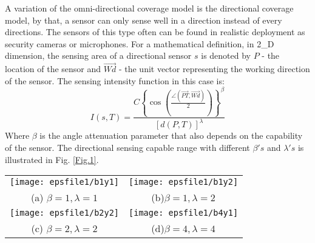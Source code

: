 \documentclass[final]{elsarticle}
\begin{document}
A variation of the omni-directional coverage model is the directional coverage model, by that, a sensor can only sense well in a direction instead of every directions. The sensors of this type often can be found in realistic deployment as security cameras or microphones.  For a mathematical definition, in 2\_D dimension, the sensing area of a directional sensor $ s $ is denoted by $ P $ - the location of the sensor and $ \overrightarrow{Wd}$ - the unit vector representing the working direction of the sensor. The sensing intensity function in this case is:
\begin{equation}
\label{eqfd}
I({s},T) = \frac{{C{{\left\{ {\cos \left( {\frac{{\angle (\overrightarrow {PT} ,\overrightarrow {Wd}) }}{2}} \right)} \right\}}^\beta }}}{{{{\left[ {d(P,T)} \right]}^\lambda }}}
\end{equation}
Where $\beta$ is the angle attenuation parameter that also depends on the capability of the sensor. The directional sensing capable range with different $ \beta's $ and $ \lambda's $ is illustrated in Fig. \ref{Fig.1}. \\
\begin{figure*}[h]
	\begin{tabular}{cc}
		\texttt{[image: epsfile1/b1y1]}&\texttt{[image: epsfile1/b1y2]}\\
		(a) $\beta =1, \lambda=1 $ &(b)$ \beta=1, \lambda=2 $\\
		\texttt{[image: epsfile1/b2y2]}&\texttt{[image: epsfile1/b4y1]}\\
		(c) $ \beta=2, \lambda=2 $& (d)$ \beta=4, \lambda=4 $\\
	\end{tabular}
	\centering
	\caption{Illustration attenuated directional sensing model with different $ \beta's $ and $ \lambda's $
	}
	\label{Fig.1}       %
\end{figure*}
\end{document}
